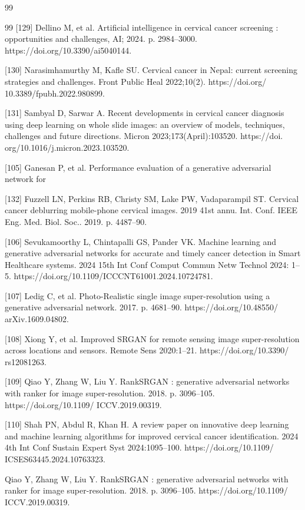 \documentclass{svjour3}
\begin{document}
\begin{thebibliography}{99}
\begin{thebibliography}{99}
 [129] Dellino M, et al. Artificial intelligence in cervical cancer screening : opportunities and challenges, AI; 2024. p. 2984–3000. https://doi.org/10.3390/ai5040144.

 [130] Narasimhamurthy M, Kafle SU. Cervical cancer in Nepal: current screening strategies and challenges. Front Public Heal 2022;10(2). https://doi.org/ 10.3389/fpubh.2022.980899.

 [131] Sambyal D, Sarwar A. Recent developments in cervical cancer diagnosis using deep learning on whole slide images: an overview of models, techniques, challenges and future directions. Micron 2023;173(April):103520. https://doi. org/10.1016/j.micron.2023.103520.

 [105] Ganesan P, et al. Performance evaluation of a generative adversarial network for

 [132] Fuzzell LN, Perkins RB, Christy SM, Lake PW, Vadaparampil ST. Cervical cancer deblurring mobile-phone cervical images. 2019 41st annu. Int. Conf. IEEE Eng. Med. Biol. Soc.. 2019. p. 4487–90.

 [106] Sevukamoorthy L, Chintapalli GS, Pander VK. Machine learning and generative adversarial networks for accurate and timely cancer detection in Smart Healthcare systems. 2024 15th Int Conf Comput Commun Netw Technol 2024: 1–5. https://doi.org/10.1109/ICCCNT61001.2024.10724781.

 [107] Ledig C, et al. Photo-Realistic single image super-resolution using a generative adversarial network. 2017. p. 4681–90. https://doi.org/10.48550/ arXiv.1609.04802.

 [108] Xiong Y, et al. Improved SRGAN for remote sensing image super-resolution across locations and sensors. Remote Sens 2020:1–21. https://doi.org/10.3390/ rs12081263.

 [109] Qiao Y, Zhang W, Liu Y. RankSRGAN : generative adversarial networks with ranker for image super-resolution. 2018. p. 3096–105. https://doi.org/10.1109/ ICCV.2019.00319.

 [110] Shah PN, Abdul R, Khan H. A review paper on innovative deep learning and machine learning algorithms for improved cervical cancer identification. 2024 4th Int Conf Sustain Expert Syst 2024:1095–100. https://doi.org/10.1109/ ICSES63445.2024.10763323.

 Qiao Y, Zhang W, Liu Y. RankSRGAN : generative adversarial networks with ranker for image super-resolution. 2018. p. 3096–105. https://doi.org/10.1109/ ICCV.2019.00319.


\end{thebibliography}
\end{thebibliography}
\end{document}

